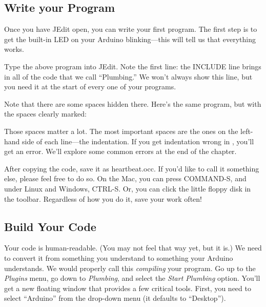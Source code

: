 \afterpage{\clearpage}

\subsection{Write your Program}
Once you have JEdit open, you can write your first program. The first step is to get the built-in LED on your Arduino blinking---this will tell us that everything works. 



Type the above program into JEdit. Note the first line: the {\code INCLUDE} line brings in all of the code that we call ``Plumbing.'' We won't always show this line, but {\strong you need it at the start of every one of your programs}.

Note that there are some spaces hidden there. Here's the same program, but with the spaces clearly marked:



Those {\strong spaces matter a lot}. The most important spaces are the ones on the left-hand side of each line---the {\strong indentation}. If you get indentation wrong in \occam, you'll get an error. We'll explore some common errors at the end of the chapter. 

After copying the code, save it as {\code heartbeat.occ}. If you'd like to call it something else, please feel free to do so. On the Mac, you can press COMMAND-S, and under Linux and Windows, CTRL-S. Or, you can click the little floppy disk in the toolbar. Regardless of how you do it, save your work often!


\subsection{Build Your Code}
Your code is human-readable. (You may not feel that way yet, but it is.) We need to convert it from something you understand to something your Arduino understands. We would properly call this {\em compiling} your program. Go up to the {\em Plugins} menu, go down to {\em Plumbing}, and select the {\em Start Plumbing} option. You'll get a new floating window that provides a few critical tools. First, you need to select ``Arduino'' from the drop-down menu (it defaults to ``Desktop'').

